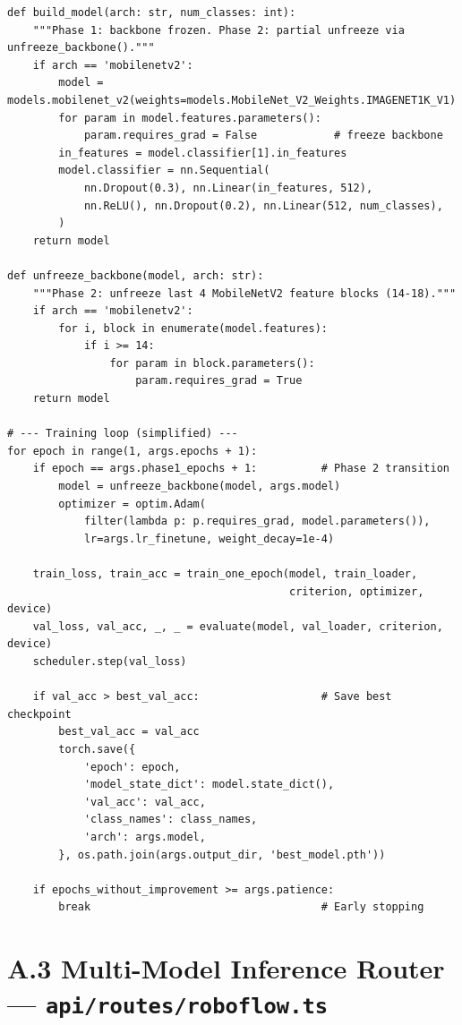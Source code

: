 \documentclass[12pt,a4paper]{report}
\begin{document}
\begin{lstlisting}[style=python, caption={Two-phase training loop with early stopping (ml/train.py)}]
def build_model(arch: str, num_classes: int):
    """Phase 1: backbone frozen. Phase 2: partial unfreeze via unfreeze_backbone()."""
    if arch == 'mobilenetv2':
        model = models.mobilenet_v2(weights=models.MobileNet_V2_Weights.IMAGENET1K_V1)
        for param in model.features.parameters():
            param.requires_grad = False            # freeze backbone
        in_features = model.classifier[1].in_features
        model.classifier = nn.Sequential(
            nn.Dropout(0.3), nn.Linear(in_features, 512),
            nn.ReLU(), nn.Dropout(0.2), nn.Linear(512, num_classes),
        )
    return model

def unfreeze_backbone(model, arch: str):
    """Phase 2: unfreeze last 4 MobileNetV2 feature blocks (14-18)."""
    if arch == 'mobilenetv2':
        for i, block in enumerate(model.features):
            if i >= 14:
                for param in block.parameters():
                    param.requires_grad = True
    return model

# --- Training loop (simplified) ---
for epoch in range(1, args.epochs + 1):
    if epoch == args.phase1_epochs + 1:          # Phase 2 transition
        model = unfreeze_backbone(model, args.model)
        optimizer = optim.Adam(
            filter(lambda p: p.requires_grad, model.parameters()),
            lr=args.lr_finetune, weight_decay=1e-4)

    train_loss, train_acc = train_one_epoch(model, train_loader,
                                            criterion, optimizer, device)
    val_loss, val_acc, _, _ = evaluate(model, val_loader, criterion, device)
    scheduler.step(val_loss)

    if val_acc > best_val_acc:                   # Save best checkpoint
        best_val_acc = val_acc
        torch.save({
            'epoch': epoch,
            'model_state_dict': model.state_dict(),
            'val_acc': val_acc,
            'class_names': class_names,
            'arch': args.model,
        }, os.path.join(args.output_dir, 'best_model.pth'))

    if epochs_without_improvement >= args.patience:
        break                                    # Early stopping
\end{lstlisting}

\newpage

\section*{A.3 \quad Multi-Model Inference Router --- \texttt{api/routes/roboflow.ts}}
\end{document}
